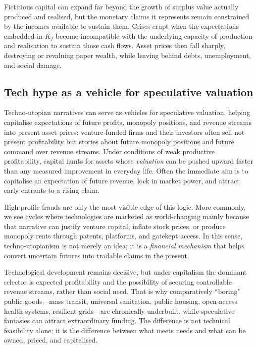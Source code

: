Fictitious capital can expand far beyond the growth of surplus value actually
produced and realised, but the monetary claims it represents remain constrained
by the incomes available to sustain them. Crises erupt when
the expectations embedded in $K_f$ become incompatible with the underlying capacity of production
and realisation to sustain those cash flows. Asset prices then fall sharply, destroying or
revaluing paper wealth, while leaving behind debts, unemployment, and social damage.

\subsection{Tech hype as a vehicle for speculative valuation}
\label{sec:tech-hype-fictitious}

Techno-utopian narratives can serve as vehicles for speculative valuation,
helping capitalise expectations of future profits, monopoly positions, and
revenue streams into present asset prices: venture-funded firms and their investors often sell not present profitability but stories about future monopoly positions and future command over revenue streams. Under conditions of weak productive profitability, capital
hunts for assets whose \emph{valuation} can be pushed upward faster than any measured improvement
in everyday life. Often the immediate aim is to capitalise an expectation of future revenue, lock in market power, and attract early entrants to a rising claim.

High-profile frauds are only the most visible edge of this logic. More commonly, we see cycles where
technologies are marketed as world-changing mainly because that narrative can justify venture capital,
inflate stock prices, or produce monopoly rents through patents, platforms, and gatekept access.
In this sense, techno-utopianism is not merely an idea; it is a \emph{financial mechanism} that helps
convert uncertain futures into tradable claims in the present.

Technological development remains decisive, but under capitalism the dominant selector
is expected profitability and the possibility of securing controllable revenue streams,
rather than social need.
That is why comparatively ``boring'' public goods---mass transit, universal sanitation, public housing,
open-access health systems, resilient grids---are chronically underbuilt, while speculative fantasies
can attract extraordinary funding. The difference is not technical feasibility alone; it is the
difference between what meets needs and what can be owned, priced, and capitalised.

